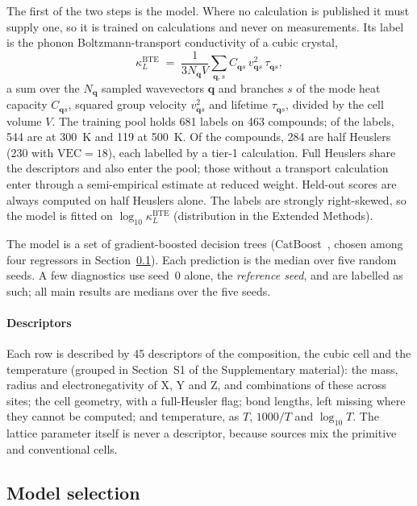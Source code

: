The first of the two steps is the model. Where no calculation is published it must supply one, so it
is trained on calculations and never on measurements. Its label is the phonon Boltzmann-transport conductivity of a cubic crystal,
%
\begin{equation}
  \kappa_L^{\mathrm{BTE}} \;=\; \frac{1}{3N_{\mathbf{q}}V}\sum_{\mathbf{q},s}
    C_{\mathbf{q}s}\, v_{\mathbf{q}s}^{2}\, \tau_{\mathbf{q}s},
  \label{eq:bte}
\end{equation}
%
a sum over the $N_{\mathbf{q}}$ sampled wavevectors $\mathbf{q}$ and branches $s$ of the mode heat
capacity $C_{\mathbf{q}s}$, squared group velocity $v_{\mathbf{q}s}^{2}$ and lifetime
$\tau_{\mathbf{q}s}$, divided by the cell volume $V$. The training pool holds \num{681} labels on
\num{463} compounds; of the labels, \num{544} are at \SI{300}{\kelvin} and \num{119} at
\SI{500}{\kelvin}. Of the compounds, \num{284} are half Heuslers (\num{230} with
$\mathrm{VEC}=18$), each labelled by a tier-1 calculation. Full Heuslers share the descriptors and
also enter the pool; those without a transport calculation enter through a semi-empirical estimate
at reduced weight. Held-out scores are always computed on half Heuslers alone. The labels are
strongly right-skewed, so the model is fitted on $\log_{10}\kappa_L^{\mathrm{BTE}}$ (distribution in
the Extended Methods).

The model is a set of gradient-boosted decision trees (CatBoost~\cite{prokhorenkova2017catboost}, chosen among four regressors in
Section~\ref{sec:modelselection}). Each prediction is the median over five random seeds. A few
diagnostics use seed~0 alone, the \emph{reference seed}, and are labelled as such; all main results
are medians over the five seeds.

\paragraph{Descriptors} Each row is described by \num{45} descriptors of the composition, the cubic
cell and the temperature (grouped in Section~S1 of the Supplementary material): the mass, radius and
electronegativity of X, Y and Z, and combinations of these across sites; the cell geometry, with a
full-Heusler flag; bond lengths, left missing where they cannot be computed; and temperature, as
$T$, $1000/T$ and $\log_{10}T$. The lattice parameter itself is never a descriptor, because sources
mix the primitive and conventional cells.

\subsection{Model selection}
\label{sec:modelselection}

